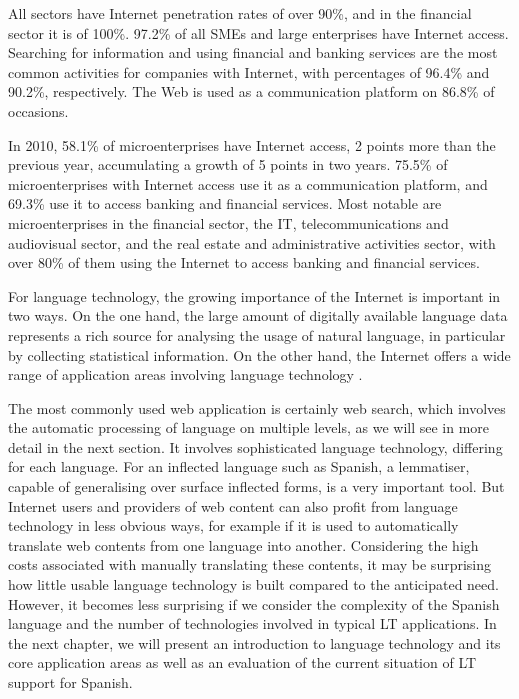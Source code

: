 \begin{multicols}{2}

All sectors have Internet penetration rates of over 90\%, and in the financial sector it is of 100\%. 97.2\% of all SMEs and large enterprises have Internet access. Searching for information and using financial and banking services are the most common activities for companies with Internet, with percentages of 96.4\% and 90.2\%, respectively. The Web is used as a communication platform on 86.8\% of occasions.

In 2010, 58.1\% of microenterprises have Internet access, 2 points more than the previous year, accumulating a growth of 5 points in two years. 75.5\% of microenterprises with Internet access use it as a communication platform, and 69.3\% use it to access banking and financial services. Most notable are microenterprises in the financial sector, the IT, telecommunications and audiovisual sector, and the real estate and administrative activities sector, with over 80\% of them using the Internet to access banking and financial services.

For language technology, the growing importance of the Internet is important in two ways. On the one hand, the large amount of digitally available language data represents a rich source for analysing the usage of natural language, in particular by collecting statistical information. On the other hand, the Internet offers a wide range of application areas involving language technology \cite{lenguatec}.

The most commonly used web application is certainly web search, which involves the automatic processing of language on multiple levels, as we will see in more detail in the next section. It involves sophisticated language technology, differing for each language. For an inflected language such as Spanish, a lemmatiser, capable of generalising over surface inflected forms, is a very important tool. But Internet users and providers of web content can also profit from language technology in less obvious ways, for example if it is used to automatically translate web contents from one language into another. Considering the high costs associated with manually translating these contents, it may be surprising how little usable language technology is built compared to the anticipated need. However, it becomes less surprising if we consider the complexity of the Spanish language and the number of technologies involved in typical LT applications. In the next chapter, we will present an introduction to language technology and its core application areas as well as an evaluation of the current situation of LT support for Spanish. 

\end{multicols}

